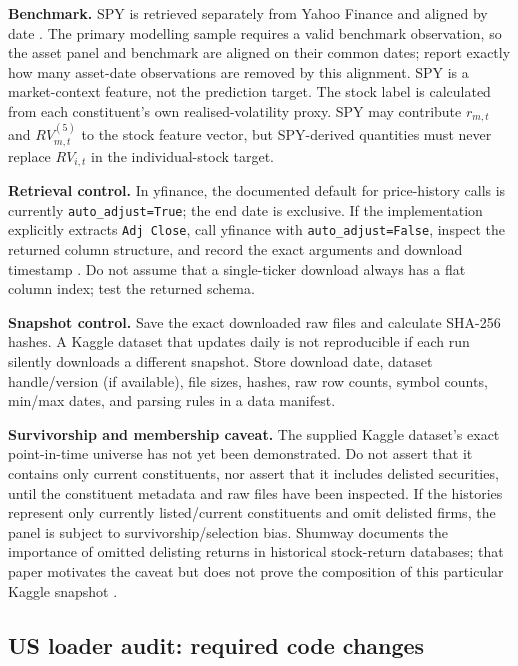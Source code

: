 \documentclass[11pt,a4paper]{article}
\begin{document}
\textbf{Benchmark.} SPY is retrieved separately from Yahoo Finance and aligned by date \cite{SPYYahoo}. The primary modelling sample requires a valid benchmark observation, so the asset panel and benchmark are aligned on their common dates; report exactly how many asset-date observations are removed by this alignment. SPY is a market-context feature, not the prediction target. The stock label is calculated from each constituent's own realised-volatility proxy. SPY may contribute $r_{m,t}$ and $RV_{m,t}^{(5)}$ to the stock feature vector, but SPY-derived quantities must never replace $RV_{i,t}$ in the individual-stock target.

\textbf{Retrieval control.} In yfinance, the documented default for price-history calls is currently \texttt{auto\_adjust=True}; the end date is exclusive. If the implementation explicitly extracts \texttt{Adj Close}, call yfinance with \texttt{auto\_adjust=False}, inspect the returned column structure, and record the exact arguments and download timestamp \cite{YFinanceHistory}. Do not assume that a single-ticker download always has a flat column index; test the returned schema.

\textbf{Snapshot control.} Save the exact downloaded raw files and calculate SHA-256 hashes. A Kaggle dataset that updates daily is not reproducible if each run silently downloads a different snapshot. Store download date, dataset handle/version (if available), file sizes, hashes, raw row counts, symbol counts, min/max dates, and parsing rules in a data manifest.

\begin{warningbox}
\textbf{Survivorship and membership caveat.} The supplied Kaggle dataset's exact point-in-time universe has not yet been demonstrated. Do not assert that it contains only current constituents, nor assert that it includes delisted securities, until the constituent metadata and raw files have been inspected. If the histories represent only currently listed/current constituents and omit delisted firms, the panel is subject to survivorship/selection bias. Shumway documents the importance of omitted delisting returns in historical stock-return databases; that paper motivates the caveat but does not prove the composition of this particular Kaggle snapshot \cite{Shumway1997}.
\end{warningbox}

\subsection{US loader audit: required code changes}
\end{document}

